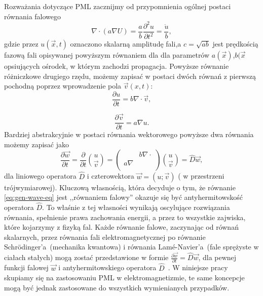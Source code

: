 Rozważania dotyczące PML zacznijmy od przypomnienia ogólnej postaci równania falowego
\begin{equation}
\nabla \cdot ( a \nabla U) = \frac{a}{b} \frac{\partial^2 u}{\partial t^2} = \frac{\ddot{u}}{b},
\end{equation}
gdzie przez $u(\vec{x},t)$ oznaczono skalarną amplitudę fali,a  $c=\sqrt{ab}$ jest prędkością fazową fali opisywanej powyższym równaniem dla dla parametrów $a(\vec{x})$,$b(\vec{x}$ opsiujących ośrodek, w którym zachodzi propagacja. Powyższe równanie różniczkowe drugiego rzędu, możemy zapisać w postaci dwóch równań z pierwszą pochodną poprzez wprowadzenie pola $\vec{v}(x,t)$:
\begin{equation}
\frac{\partial u}{\partial t} = b \nabla \cdot \vec{v},
\end{equation}

\begin{equation}
\frac{\partial \vec{v}}{\partial t}= a\nabla u.
\end{equation}
Bardziej abstrakcyjnie w postaci równania wektorowego powyższe dwa równania możemy zapisać jako
\begin{equation}
\frac{\partial \vec{w}}{\partial t}=\frac{\partial}{\partial t} {u \choose \vec{v}} = 
	\begin{pmatrix}
		& b\nabla\cdot \\
	a\nabla & \\
	\end{pmatrix}
{u \choose \vec{v}} = \hat{D}\vec{w},
\label{eq:gen-wave-eq}
\end{equation}
dla liniowego operatora $\hat{D}$ i czterowektora $\vec{w}=(u;\vec{v})$ ( w przestrzeni trójwymiarowej). Kluczową własnością, która decyduje o tym, że równanie \ref{eq:gen-wave-eq} jest ,,równaniem falowy'' okazuje się być antyhermitowskość operatora $\hat{D}$. To właśnie z tej własności wynikają oscylujące rozwiązania równania, spełnienie prawa zachowania energii, a przez to wszystkie zajwiska, które kojarzymy z fizyką fal. Każde równanie falowe, zaczynając od równań skalarnych, przez równania fali elektromagnetycznej po równanie Schr\"{o}dinger'a~(mechanika kwantowa) i równania Lam\'{e}-Navier'a~(fale sprężyste w ciałach stałych) mogą zostać przedstawione w formie $ \frac{\partial  \vec{w}}{\partial t}=\hat{D}\vec{w}$, dla pewnej funkcji falowej $\vec{w}$ i antyhermitowskiego operatora $\hat{D}$~\cite{johnson2007notes}. W niniejsze pracy skupiamy się na zastosowaniu PML w elektromagnetizmie, te same koncepcje mogą być jednak zastosowane do wszystkich wymienianych przypadków.

